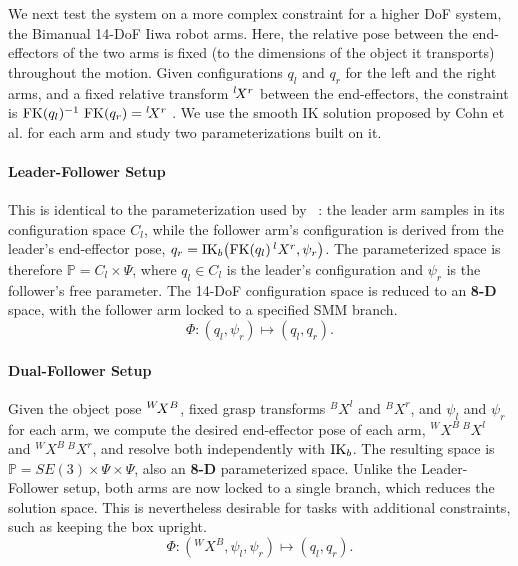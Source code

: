 \documentclass[letterpaper, 10 pt, conference]{ieeeconf}
\begin{document}
We next test the system on a more complex constraint for a higher DoF system, the Bimanual 14-DoF Iiwa robot arms. Here, the relative pose between the end-effectors of the two arms is fixed (to the dimensions of the object it transports) throughout the motion. Given configurations $q_l$ and $q_r$ for the left and the right arms, and a fixed relative transform $\monogram{X}{l}{r}$ between the end-effectors, the constraint is $\FK(q_l)^{-1}\,\FK(q_r) = \monogram{X}{l}{r}$ .  We use the smooth IK solution proposed by Cohn et al. \cite{cohn2024constrained} for each arm and study two parameterizations built on it.

\paragraph{Leader-Follower Setup}
This is identical to the parameterization used by ~\cite{cohn2024constrained}: the leader arm samples in its configuration space $C_l$, while the follower arm's configuration is derived from the leader's end-effector pose, $q_r = \IK_b\!\left(\FK(q_l)\,{}^{l}X^{r}, \psi_r\right)$.
The parameterized space is therefore $\mathbb{P} = C_l \times \Psi$, where $q_l \in C_l$ is the leader's configuration and $\psi_r$ is the follower's free parameter. The 14-DoF configuration space is reduced to an \textbf{8-D} space, with the follower arm locked to a specified SMM branch. 
\[
    \Phi : (q_l, \psi_r) \mapsto (q_l, q_r).
\]

\paragraph{Dual-Follower Setup}
Given the object pose $\monogram{X}{W}{B}$, fixed grasp transforms ${}^{B}X^{l}$ and ${}^{B}X^{r}$, and $\psi_l$ and $\psi_r$ for each arm, we compute the desired end-effector pose of each arm, ${}^{W}X^{B}\,{}^{B}X^{l}$ and ${}^{W}X^{B}\,{}^{B}X^{r}$, and resolve both independently with $\IK_b$. The resulting space is $\mathbb{P} = SE(3) \times \Psi \times \Psi$, also an \textbf{8-D} parameterized space. Unlike the Leader-Follower setup, both arms are now locked to a single branch, which reduces the solution space. This is nevertheless desirable for tasks with additional constraints, such as keeping the box upright.
\[
    \Phi : ({}^{W}X^{B}, \psi_l, \psi_r) \mapsto (q_l, q_r).
\]
\end{document}
